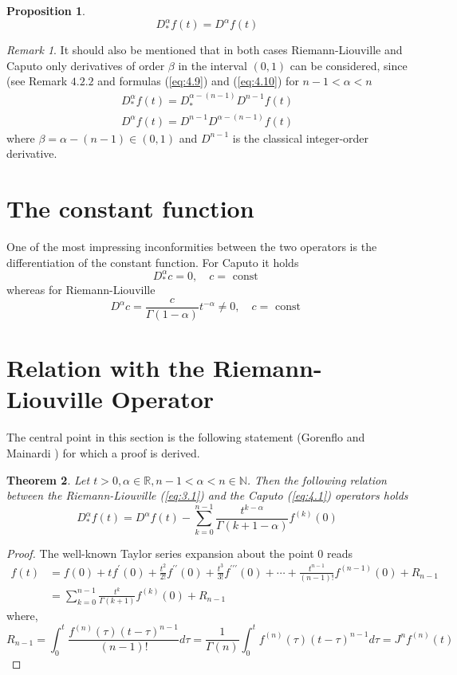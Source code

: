 \documentclass[a4paper,14pt,oneside]{book}
\theoremstyle{plain}
\newtheorem{thm}{Theorem}[section]
\newtheorem{prop}[thm]{Proposition}
\theoremstyle{definition}
\theoremstyle{remark}
\newtheorem{rmk}{Remark}[section]
\begin{document}
\begin{center}
\begin{flushleft}
{\begin{prop}
$$
D_{*}^{\alpha} f(t)=D^{\alpha} f(t)
$$
\end{prop}
\begin{rmk}
It should also be mentioned that in both cases Riemann-Liouville and Caputo only derivatives of order $\beta$ in the interval $(0,1)$ can be considered, since (see Remark $4.2.2$ and formulas (\ref{eq:4.9}) and (\ref{eq:4.10}) for $n-1<\alpha<n$
$$
\begin{array}{l}
D_{*}^{\alpha} f(t)=D_{*}^{\alpha-(n-1)} D^{n-1} f(t) \\
D^{\alpha} f(t)=D^{n-1} D^{\alpha-(n-1)} f(t)
\end{array}
$$
where $\beta=\alpha-(n-1) \in(0,1)$ and $D^{n-1}$ is the classical integer-order derivative.
\end{rmk}

\section{The constant function}
One of the most impressing inconformities between the two operators is the differentiation of the constant function. For Caputo it holds
$$
D_{*}^{\alpha} c=0, \quad c=\text { const }
$$
whereas for Riemann-Liouville
$$
D^{\alpha} c=\frac{c}{\Gamma(1-\alpha)} t^{-\alpha} \neq 0, \quad c=\text { const }
$$

\section{Relation with the Riemann-Liouville Operator}
The central point in this section is the following statement (Gorenflo and Mainardi \cite{bb18}) for which a proof is derived.

\begin{thm}
Let $t>0, \alpha \in \mathbb{R}, n-1<\alpha<n \in \mathbb{N}$. Then the following relation between the Riemann-Liouville (\ref{eq:3.1}) and the Caputo (\ref{eq:4.1}) operators holds
\begin{equation}\label{eq:4.24}
D_{*}^{\alpha} f(t)=D^{\alpha} f(t)-\sum_{k=0}^{n-1} \frac{t^{k-\alpha}}{\Gamma(k+1-\alpha)} f^{(k)}(0)
\end{equation}
\end{thm}
\begin{proof}
The well-known Taylor series expansion about the point 0 reads
$$
\begin{aligned}
f(t) &=f(0)+t f^{\prime}(0)+\frac{t^{2}}{2 !} f^{\prime \prime}(0)+\frac{t^{3}}{3 !} f^{\prime \prime \prime}(0)+\cdots+\frac{t^{n-1}}{(n-1) !} f^{(n-1)}(0)+R_{n-1} \\
&=\sum_{k=0}^{n-1} \frac{t^{k}}{\Gamma(k+1)} f^{(k)}(0)+R_{n-1}
\end{aligned}
$$
where,
$$
R_{n-1}=\int_{0}^{t} \frac{f^{(n)}(\tau)(t-\tau)^{n-1}}{(n-1) !} d \tau=\frac{1}{\Gamma(n)} \int_{0}^{t} f^{(n)}(\tau)(t-\tau)^{n-1} d \tau=J^{n} f^{(n)}(t)
$$


\end{proof}}
\end{flushleft}
\end{center}
\end{document}

